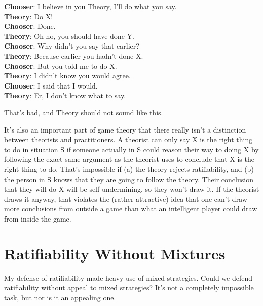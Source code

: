\documentclass[
  12pt,
  letterpaper,
  DIV=11,
  numbers=noendperiod]{scrreprt}
\begin{document}
\textbf{Chooser}: I believe in you Theory, I'll do what you say.\\
\textbf{Theory}: Do X!\\
\textbf{Chooser}: Done.\\
\textbf{Theory}: Oh no, you should have done Y.\\
\textbf{Chooser}: Why didn't you say that earlier?\\
\textbf{Theory}: Because earlier you hadn't done X.\\
\textbf{Chooser}: But you told me to do X.\\
\textbf{Theory}: I didn't know you would agree.\\
\textbf{Chooser}: I said that I would.\\
\textbf{Theory}: Er, I don't know what to say.

That's bad, and Theory should not sound like this.

It's also an important part of game theory that there really isn't a
distinction between theorists and practitioners. A theorist can only say
X is the right thing to do in situation S if someone actually in S could
reason their way to doing X by following the exact same argument as the
theorist uses to conclude that X is the right thing to do. That's
impossible if (a) the theory rejects ratifiability, and (b) the person
in S knows that they are going to follow the theory. Their conclusion
that they will do X will be self-undermining, so they won't draw it. If
the theorist draws it anyway, that violates the (rather attractive) idea
that one can't draw more conclusions from outside a game than what an
intelligent player could draw from inside the game.

\section{Ratifiability Without
Mixtures}\label{ratifiability-without-mixtures}

My defense of ratifiability made heavy use of mixed strategies. Could we
defend ratifiability without appeal to mixed strategies? It's not a
completely impossible task, but nor is it an appealing one.
\end{document}
